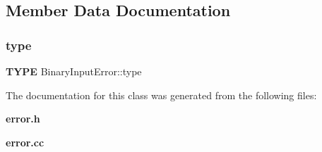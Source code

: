 \subsection{Member Data Documentation}
\mbox{\label{classBinaryInputError_aad5342bc5ab9fb78cc72818505aaed97}} 
\subsubsection{type}
{\footnotesize\ttfamily \textbf{ T\+Y\+PE} Binary\+Input\+Error\+::type\hspace{0.3cm}{\ttfamily [private]}}



The documentation for this class was generated from the following files\+:\begin{DoxyCompactItemize}
\item 
\textbf{ error.\+h}\item 
\textbf{ error.\+cc}\end{DoxyCompactItemize}
